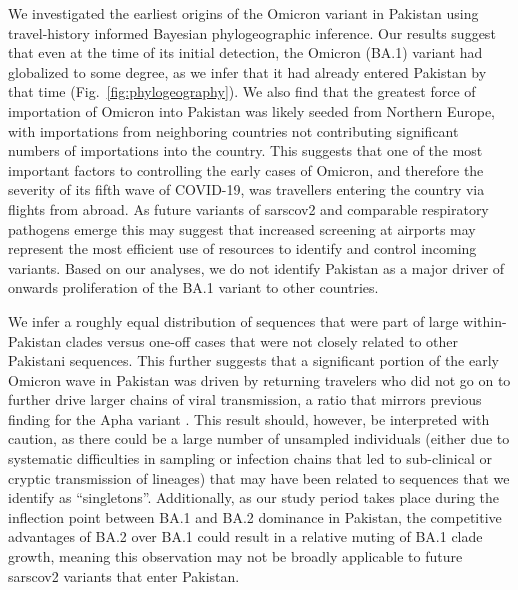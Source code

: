 We investigated the earliest origins of the Omicron variant in Pakistan using travel-history informed Bayesian phylogeographic inference.
Our results suggest that even at the time of its initial detection, the Omicron (BA.1) variant had globalized to some degree, as we infer that it had already entered Pakistan by that time (Fig.~\ref{fig:phylogeography}).
We also find that the greatest force of importation of Omicron into Pakistan was likely seeded from Northern Europe, with importations from neighboring countries not contributing significant numbers of importations into the country.
This suggests that one of the most important factors to controlling the early cases of Omicron, and therefore the severity of its fifth wave of COVID-19, was travellers entering the country via flights from abroad.
As future variants of \gls{sarscov2} and comparable respiratory pathogens emerge this may suggest that increased screening at airports may represent the most efficient use of resources to identify and control incoming variants.
Based on our analyses, we do not identify Pakistan as a major driver of onwards proliferation of the BA.1 variant to other countries.

We infer a roughly equal distribution of sequences that were part of large within-Pakistan clades versus one-off cases that were not closely related to other Pakistani sequences.
This further suggests that a significant portion of the early Omicron wave in Pakistan was driven by returning travelers who did not go on to further drive larger chains of viral transmission, a ratio that mirrors previous finding for the Apha variant \citep{nasir2022evolutionary}.
This result should, however, be interpreted with caution, as there could be a large number of unsampled individuals (either due to systematic difficulties in sampling or infection chains that led to sub-clinical or cryptic transmission of lineages) that may have been related to sequences that we identify as ``singletons''. 
Additionally, as our study period takes place during the inflection point between BA.1 and BA.2 dominance in Pakistan, the competitive advantages of BA.2 over BA.1 could result in a relative muting of BA.1 clade growth, meaning this observation may not be broadly applicable to future \gls{sarscov2} variants that enter Pakistan.

